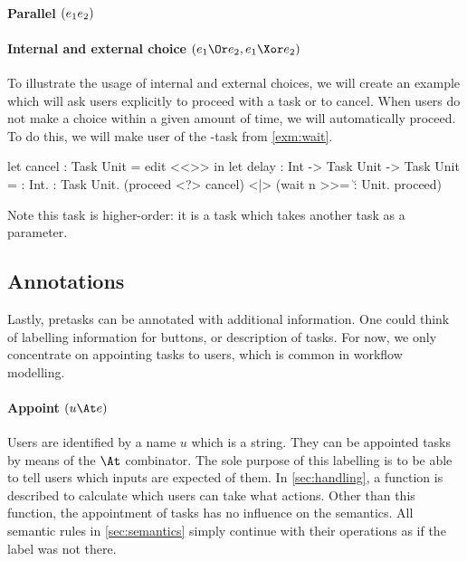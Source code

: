 \paragraph{Parallel $(e_1 \relax e_2)$}




\paragraph{Internal and external choice $(e_1 \Or e_2, e_1 \Xor e_2)$}


\begin{example}[Delay]


To illustrate the usage of internal and external choices,
we will create an example which will ask users explicitly to proceed with a task or to cancel.
When users do not make a choice within a given amount of time,
we will automatically proceed.
To do this,
we will make user of the -task from \autoref{exm:wait}.
\begin{TASK}
  let cancel : Task Unit = edit <<>> in
  let delay : Int -> Task Unit -> Task Unit =
    \n : Int. \proceed : Task Unit.
    (proceed <?> cancel) <|> (wait n >>= \u : Unit. proceed)
\end{TASK}
Note this task is higher-order:
it is a task which takes another task as a parameter.

\end{example}



\subsection{Annotations}

Lastly, pretasks can be annotated with additional information.
One could think of labelling information for buttons,
or description of tasks.
For now, we only concentrate on appointing tasks to users,
which is common in workflow modelling.



\paragraph{Appoint $(u \At e)$}

Users are identified by a name $u$ which is a string.
They can be appointed tasks by means of the $\At$ combinator.
The sole purpose of this labelling is to be able to tell users which inputs are expected of them.
In \autoref{sec:handling}, a function is described to calculate which users can take what actions.
Other than this function, the appointment of tasks has no influence on the semantics.
All semantic rules in \autoref{sec:semantics} simply continue with their operations as if the label was not there.
